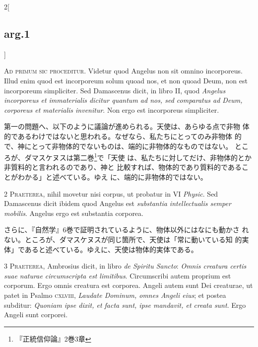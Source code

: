\documentclass[paper=a4paper,fontsize=10pt,jafontsize=9pt,titlepage]{jlreq}
\begin{document}
\begin{paracol}{2}[\subsection{arg.1}]

{\huge A}{\scshape d primum sic proceditur}. Videtur quod Angelus non
sit omnino incorporeus. Illud enim quod est incorporeum solum quoad nos,
et non quoad Deum, non est incorporeum simpliciter. Sed Damascenus
dicit, in libro II, quod {\itshape Angelus incorporeus et immaterialis
dicitur quantum ad nos, sed comparatus ad Deum, corporeus et materialis
invenitur}. Non ergo est incorporeus simpliciter.

\switchcolumn

第一の問題へ、以下のように議論が進められる。天使は、あらゆる点で非物
 体的であるわけではないと思われる。なぜなら、私たちにとってのみ非物体
 的で、神にとって非物体的でないものは、端的に非物体的なものではない。
 ところが、ダマスケヌスは第二巻\footnote{『正統信仰論』2巻3章}で「天使
 は、私たちに対してだけ、非物体的とか非質料的と言われるのであり、神と
 比較すれば、物体的であり質料的であることがわかる」と述べている。ゆえ
 に、端的に非物体的ではない。


{\scshape 2 Praeterea}, nihil movetur nisi corpus, ut probatur in VI
{\itshape Physic}. Sed Damascenus dicit ibidem quod Angelus est
{\itshape substantia intellectualis semper mobilis}. Angelus ergo est
substantia corporea.

\switchcolumn

さらに、『自然学』6巻で証明されているように、物体以外にはなにも動かさ
 れない。ところが、ダマスケヌスが同じ箇所で、天使は「常に動いている知
 的実体」であると述べている。ゆえに、天使は物体的実体である。


{\scshape 3 Praeterea}, Ambrosius dicit, in libro {\itshape de Spiritu
Sancto}: {\itshape Omnis creatura certis suae naturae circumscripta
est limitibus}. Circumscribi autem proprium est corporum. Ergo omnis
creatura est corporea. Angeli autem sunt Dei creaturae, ut patet in
Psalmo {\scshape cxlviii}, {\itshape Laudate Dominum, omnes Angeli
eius}; et postea subditur: {\itshape Quoniam ipse dixit, et facta
sunt, ipse mandavit, et creata sunt}. Ergo Angeli sunt corporei.


\end{paracol}
\end{document}
